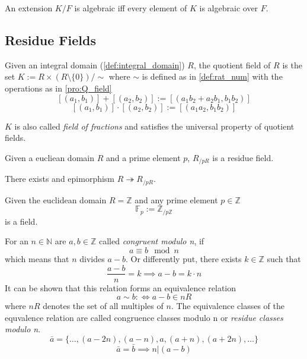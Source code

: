 \begin{definition}
   An extension \(K/F\) is algebraic iff every element of \(K\) is algebraic over \(F\).
\end{definition}

\subsection{Residue Fields}
\begin{definition}
   Given an integral domain (\ref{def:integral_domain}) \(R\), the quotient field of \(R\) is the set \(K := R \times (R \setminus \{0\})/\sim\) where \(\sim\) is defined as in \cref{def:rat_num}
   with the operations as in \cref{pro:Q_field}
   \[[(a_1, b_1)] + [(a_2, b_2)] := [(a_1b_2 + a_2b_1, b_1b_2)]\]
   \[[(a_1, b_1)] \cdot [(a_2, b_2)] := [(a_1a_2, b_1b_2)]\]
\end{definition}
\begin{remark}
   \(K\) is also called \emph{field of fractions} and satisfies the universal property of quotient fields.
\end{remark}

\begin{definition}
   Given a eucliean domain \(R\) and a prime element \(p\), \(R_{/pR}\) is a residue field.
\end{definition}
\begin{remark}
   There exists and epimorphism \(R \twoheadrightarrow R_{/pR}\).
\end{remark}

\begin{definition}
   Given the euclidean domain \(R = \mathbb{Z}\) and any prime element \(p \in \mathbb{Z}\)
   \[\mathbb{F}_p := \mathbb{Z}_{/p\mathbb{Z}}\]
   is a field.
\end{definition}

For an \(n \in \mathbb{N}\) are \(a, b \in \mathbb{Z}\) called \textit{congruent modulo n}, if
\[a \equiv b \mod n\]
which means that \(n\) divides \(a - b\).
Or differently put, there exists \(k \in \mathbb{Z}\) such that
\[\frac{a - b}{n} = k \implies a - b = k \cdot n\]
It can be shown that this relation forms an equivalence relation
\[a \sim b :\iff a - b \in nR\]
where \(nR\) denotes the set of all multiples of \(n\).
The equivalence classes of the equvalence relation are called congruence classes modulo n or \textit{residue classes modulo n}.
\[\bar{a} = \{\ldots, (a-2n), (a-n), a, (a+n), (a+2n), \ldots\}\]
\[\bar{a} = \bar{b} \implies n | (a - b)\]

